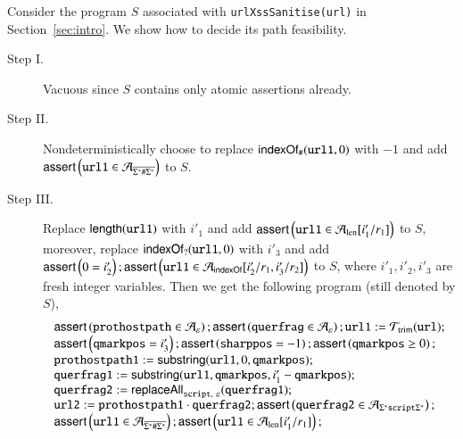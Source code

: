 	Consider the program $S$ associated with {\tt urlXssSanitise(url)} in Section~\ref{sec:intro}. %
	We show how to decide its path feasibility. %
	\begin{description}
		\item[Step I.]   Vacuous since $S$ contains only atomic assertions already. %
		\item[Step II.] Nondeterministically choose to replace $\mathsf{indexOf}_\#(\mathtt{url1}, 0)$ with $-1$ and add $\textsf{assert}\left(\mathtt{url1} \in \mathcal{A}_{\overline{\Sigma^*\#\Sigma^*}}\right)$ to $S$.  
		\item[Step III.] Replace $\mathsf{length}(\mathtt{url1})$ with $i'_1$ and add $\textsf{assert}\left(\mathtt{url1} \in \mathcal{A}_{\rm len}[i'_1/r_1]\right)$ to $S$, moreover, replace $\mathsf{indexOf}_?(\mathtt{url1}, 0)$ with $i'_3$ and add $\textsf{assert}\left(0= i'_2\right); \textsf{assert}\left(\mathtt{url1} \in \mathcal{A}_{\mathsf{indexOf}}[i'_2/r_1, i'_3/r_2]\right)$ to $S$, where $i'_1, i'_2, i'_3$ are fresh integer variables. Then we get the following program (still denoted by $S$), 
		\[ 
		\begin{array}{l}
		\ASSERT{\mathtt{prothostpath} \in \NFA_\varepsilon}; \ASSERT{\mathtt{querfrag} \in \NFA_\varepsilon}; \mathtt{url1} := \NFT_{\rm trim}(\mathtt{url}); \\
		\ASSERT{\mathtt{qmarkpos} = i'_3}; \ASSERT{\mathtt{sharppos} =-1 }; \ASSERT{\mathtt{qmarkpos} \ge 0}; \\ 
		\mathtt{prothostpath1} := \substring(\mathtt{url1}, 0, \mathtt{qmarkpos});\\
		\mathtt{querfrag1} := \substring(\mathtt{url1, qmarkpos}, i'_1 - \mathtt{qmarkpos});\\
		\mathtt{querfrag2} := \replaceall_{\mathtt{script},\ \varepsilon}(\mathtt{querfrag1});\\
		\mathtt{url2} := \mathtt{prothostpath1} \concat \mathtt{querfrag2}; \ASSERT{\mathtt{querfrag2} \in  \NFA_{\Sigma^*\mathtt{script}\Sigma^*}};  \\
		\ASSERT{\mathtt{url1} \in  \NFA_{\overline{\Sigma^*\#\Sigma^*}}}; \ASSERT{\mathtt{url1} \in \CEFA_{\rm len}[i'_1/r_1]}; \\

\end{array}\]
\end{description}
